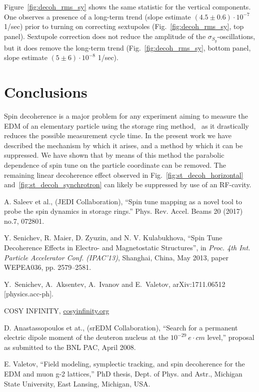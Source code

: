 \documentclass[a4paper]{jacow}
\begin{document}
Figure~\ref{fig:decoh_rms_sy} shows the same statistic for the vertical components. One observes a presence of a long-term trend (slope estimate $(4.5 \pm 0.6)\cdot 10^{-7}$ 1/sec) prior to turning on correcting sextupoles (Fig.~\ref{fig:decoh_rms_sy}, top panel). Sextupole correction does not reduce the amplitude of the $\sigma_{S_y}$-oscillations, but it does remove the long-term trend (Fig.~\ref{fig:decoh_rms_sy}, bottom panel,
slope estimate $(5 \pm 6) \cdot 10^{-8}$ 1/sec).

\section{Conclusions}
Spin decoherence is a major problem for any experiment aiming to measure the EDM of an elementary particle
using the storage ring method,~\cite{BNL:Deuteron2008} as it drastically reduces the
possible measurement cycle time. In the present work we have described the mechanism by which it arises,
and a method by which it can be suppressed. We have shown that by means of this method the
parabolic dependence of spin tune on the particle coordinate can be removed. The remaining
linear decoherence effect observed in Fig.~\ref{fig:st_decoh_horizontal} and~\ref{fig:st_decoh_synchrotron}
can likely be suppressed by use of an RF-cavity.~\cite[p.~210]{Eremey:Thesis}

\begin{thebibliography}{9}
  
  A. Saleev et al., (JEDI Collaboration), ``Spin tune mapping as a novel tool to probe
  the spin dynamics in storage rings.'' Phys. Rev. Accel. Beams 20 (2017) no.7, 072801.

   Y. Senichev, R. Maier, D. Zyuzin, and N. V. Kulabukhova,
   \textquotedblleft{Spin Tune Decoherence Effects in Electro- and Magnetostatic Structures}\textquotedblright,
   in \emph{Proc. 4th Int. Particle Accelerator Conf. (IPAC'13)}, Shanghai, China, May 2013, paper WEPEA036,
   pp. 2579--2581. 

  Y.~Senichev, A.~Aksentev, A.~Ivanov and E.~Valetov,
  arXiv:1711.06512 [physics.acc-ph].

  COSY INFINITY, \url{cosyinfinity.org}

  D. Anastassopoulos et at., (srEDM Collaboration), ``Search for a permanent electric dipole moment of
  the deuteron nucleus at the $10^{-29}~e\cdot cm$ level,'' proposal as submitted to the BNL PAC, April 2008.

  E. Valetov, ``Field modeling, symplectic tracking, and spin decoherence for the EDM and muon g-2 lattices,''
  PhD thesis, Dept. of Phys. and Astr., Michigan State University, East Lansing, Michigan, USA.
  
\end{thebibliography}
\end{document}
